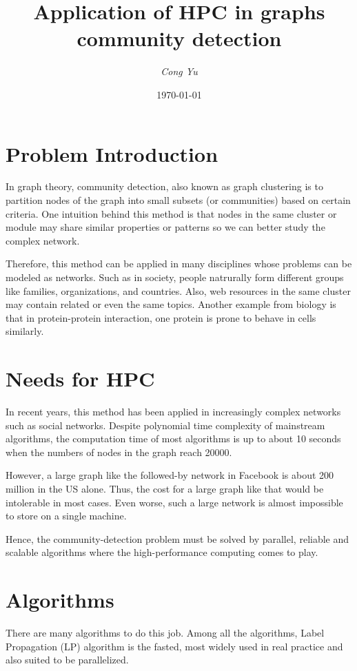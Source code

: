 \documentclass[titlepage]{article}
\title{
    Application of HPC in graphs community detection
}
\author{\itshape Cong Yu}
\date{\today}
\begin{document}
\maketitle

\setlength{\parindent}{0em}
\setlength{\parskip}{0.5em}

\section{Problem Introduction}
In graph theory, community detection, also known as graph clustering is to partition nodes of the graph into small
subsets (or communities) based on certain criteria. 
One intuition behind this method is
that nodes in the same cluster or module may share similar properties
or patterns so we can better study the complex network.

Therefore, this method can be applied in many disciplines whose problems can
be modeled as networks. Such as in society, people natrurally form different groups like families, organizations, and countries. Also, 
web resources in the same cluster may contain related or even the same topics. 
Another example from biology is that in protein-protein interaction,
one protein is prone to behave in cells similarly.
\cite{1}

\section{Needs for HPC}
In recent years, this method has been applied in increasingly complex 
networks such as social networks. Despite polynomial time complexity
of mainstream algorithms, the computation time of most algorithms is up 
to about 10 seconds when the numbers of nodes in the graph reach 20000.

However, a large graph like the followed-by network in Facebook is about
200 million in the US alone. \cite{2}
Thus, the cost for a large graph like that would be intolerable in
most cases. Even worse, such a large network is almost impossible to store on a single machine.

Hence, the community-detection problem must be solved by parallel,
reliable and scalable algorithms where the high-performance computing
comes to play.

\section{Algorithms}
There are many algorithms to do this job. Among all the algorithms,
Label Propagation (LP) algorithm \cite{3} is the fasted, most widely
used in real practice and also suited to be parallelized.
\end{document}
